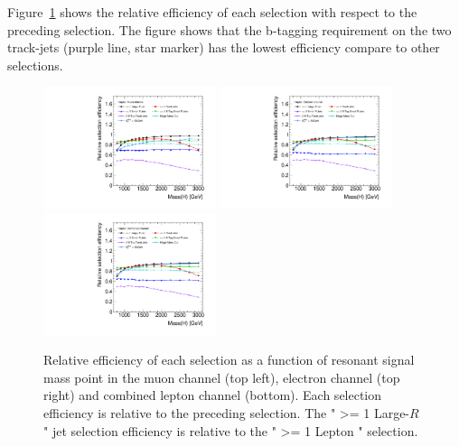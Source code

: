 Figure~\ref{fig:boosted_signalreleff} shows the relative efficiency of each selection with respect to the preceding selection. The figure
shows that the b-tagging requirement on the two track-jets (purple line, star marker) has the lowest efficiency compare to other selections.

\begin{figure}[!htbp]
\begin{center}
\includegraphics*[width=0.45\textwidth]{./figures/boosted/signaleff_muon_releff}
\includegraphics*[width=0.45\textwidth]{./figures/boosted/signaleff_elec_releff}\\
\includegraphics*[width=0.45\textwidth]{./figures/boosted/signaleff_lepton_releff}
\caption{Relative efficiency of each selection as a function of resonant signal mass point
in the muon channel (top left), electron channel (top right) and combined 
lepton channel (bottom). Each selection efficiency is relative to the preceding selection.
The " >= 1 Large-$R$ " jet selection efficiency is relative to the " >= 1 Lepton " selection.}
\label{fig:boosted_signalreleff}
\end{center}
\end{figure}

\FloatBarrier

